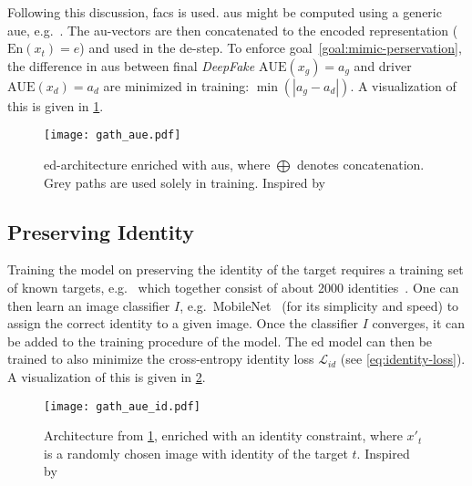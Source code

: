 \par
Following this discussion, \gls{facs} is used. \Glspl{au} might be computed using
a generic \gls{aue}, e.g.\ \cite{Senechal.2015}. The \gls{au}-vectors are then
concatenated to the encoded representation (\(\text{En}(x_t)=e\)) and used in
the \gls{de}-step. To enforce goal~\ref{goal:mimic-perservation}, the difference
in \glspl{au} between final \textit{DeepFake} \(\text{AUE}(x_g)=a_g\) and driver
\(\text{AUE}(x_d)=a_d\) are minimized in training: \(\min{(\left|a_g-a_d\right|)}\).
A visualization of this is given in \cref{fig:gath-aue}.
\begin{figure}[htp]
    \center{}
    \vspace{-.5em}
    \texttt{[image: gath\_aue.pdf]}
    \caption{\gls{ed}-architecture enriched with \glspl{au}, where \(\bigoplus\)
    denotes concatenation. Grey paths are used solely in training. Inspired
    by~\cite{Mirsky.2020, Pham.2018}}\label{fig:gath-aue}
    \vspace{-2em}
\end{figure}

\subsection{Preserving Identity}
Training the model on preserving the identity of the target requires a training
set of known targets, e.g.\ \cite{Chen.2015,Cao.2014,Tarres.2011} which together
consist of about 2000 identities~\cite{Pham.2018}. One can then learn an image
classifier \(I\), e.g.\ MobileNet~\cite{Howard.2017} (for its simplicity and speed)
to assign the correct identity to a given image. Once the classifier \(I\)
converges, it can be added to the training procedure of the model. The \gls{ed}
model can then be trained to also minimize the cross-entropy identity loss
\(\mathcal{L}_{id}\) (see \cref{eq:identity-loss}). A visualization of this is
given in \cref{fig:gath-aue-id}.
\begin{figure}[htp]
    \vspace{-.5em}
    \center{}
    \texttt{[image: gath\_aue\_id.pdf]}
    \caption{Architecture from \cref{fig:gath-aue}, enriched with an identity
    constraint, where \(x'_t\) is a randomly chosen image with identity of the target
    \(t\). Inspired by~\cite{Mirsky.2020, Pham.2018}}\label{fig:gath-aue-id}
    \vspace{-2em}
\end{figure}

